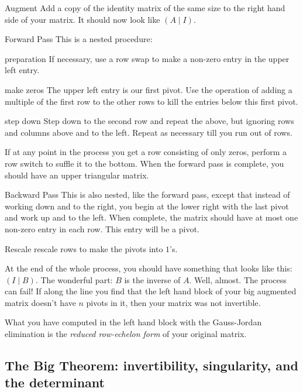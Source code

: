 \documentclass[11pt]{amsart}
\theoremstyle{definition}
\begin{document}
\begin{compactdesc}
\item[Augment] Add a copy of the identity matrix of the same size to the right hand side of your matrix. It should now look like $(A \mid I)$.

\item[Forward Pass] This is a nested procedure:
\begin{compactdesc}
\item[preparation] If necessary, use a row swap to make a non-zero entry in the upper left entry.
\item[make zeros] The upper left entry is our first pivot. Use the operation of adding a multiple of the first row to the other rows to kill the entries below this first pivot.
\item[step down] Step down to the second row and repeat the above, but ignoring rows and columns above and to the left. Repeat as necessary till you run out of rows.
\end{compactdesc}
If at any point in the process you get a row consisting of only zeros, perform a row switch to suffle it to the bottom.
When the forward pass is complete, you should have an upper triangular matrix.

\item[Backward Pass] This is also nested, like the forward pass, except that instead of working down and to the right, you begin at the lower right with the last pivot and work up and to the left. When complete, the matrix should have at most one non-zero entry in each row. This entry will be a pivot.

\item[Rescale] rescale rows to make the pivots into $1$'s.
\end{compactdesc}

At the end of the whole process, you should have something that looks like this: $(I \mid B)$. The wonderful part: $B$ is the inverse of $A$. Well, almost. The process can fail! If along the line you find that the left hand block of your big augmented matrix doesn't have $n$ pivots in it, then your matrix was not invertible.

What you have computed in the left hand block with the Gauss-Jordan elimination is the \emph{reduced row-echelon form} of your original matrix.


\subsection{The Big Theorem: invertibility, singularity, and the determinant}
\end{document}

